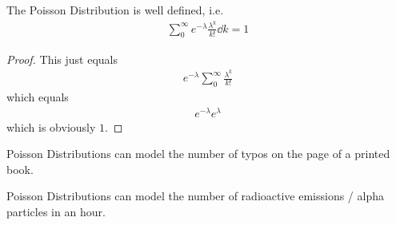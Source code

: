 \begin{proposition}
    The Poisson Distribution is well defined, i.e.
    \begin{align}
        \sum_0^\infty e^{-\lambda} \frac{\lambda^k}{k!} \dd{k} = 1
    \end{align}
\end{proposition}
\begin{proof}
    This just equals
    \begin{align}
        e^{-\lambda} \sum_0^\infty \frac{\lambda^k}{k!}
    \end{align}
    which equals
    \begin{align}
        e^{-\lambda}e^{\lambda}
    \end{align}
    which is obviously $1$.
\end{proof}
\begin{example}
    Poisson Distributions can model the number of typos on the page of a printed book.
\end{example}
\begin{example}
    Poisson Distributions can model the number of radioactive emissions / alpha particles in an hour.
\end{example}

